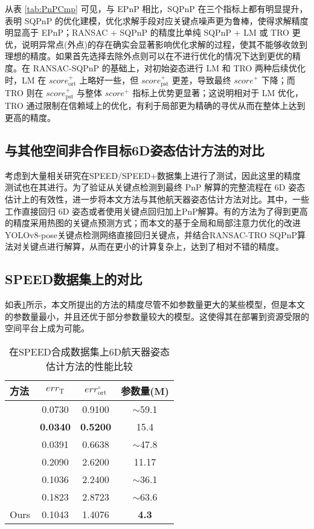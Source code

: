 从表 \ref{tab:PnPCmp} 可见，与 EPnP 相比，SQPnP 在三个指标上都有明显提升，表明 SQPnP 的优化建模，优化求解手段对应关键点噪声更为鲁棒，使得求解精度明显高于 EPnP；RANSAC + SQPnP 的精度比单纯 SQPnP + LM 或 TRO 更优，说明异常点(外点)的存在确实会显著影响优化求解的过程，使其不能够收敛到理想的精度。如果首先选择去除外点则可以在不进行优化的情况下达到更优的精度。在 RANSAC-SQPnP 的基础上，对初始姿态进行 LM 和 TRO 两种后续优化时，LM 在 $score_{\text{ort}}^+$ 上略好一些，但 $score_{\text{pst}}^+$ 更差，导致最终 $score^+$ 下降；而 TRO 则在 $score_{\text{pst}}^+$ 与整体 $score^+$ 指标上优势更显著；这说明相对于 LM 优化，TRO 通过限制在信赖域上的优化，有利于局部更为精确的寻优从而在整体上达到更高的精度。


\subsection{与其他空间非合作目标6D姿态估计方法的对比}
\label{sec:RANSAC-TRO-SQPnP:OthersCompare}
考虑到大量相关研究在SPEED/SPEED+数据集上进行了测试，因此这里的精度测试也在其进行。为了验证从关键点检测到最终 PnP 解算的完整流程在 6D 姿态估计上的有效性，进一步将本文方法与其他航天器姿态估计方法对比。其中，一些工作直接回归 6D 姿态或者使用关键点回归加上PnP解算。有的方法为了得到更高的精度采用热图的关键点预测方式；而本文的基于全局和局部注意力优化的改进YOLOv8-pose关键点检测网络直接回归关键点，并结合RANSAC-TRO SQPnP算法对关键点进行解算，从而在更小的计算复杂上，达到了相对不错的精度。


\subsection{SPEED数据集上的对比}
如表\ref{tab:SPEED_Comparison}所示，本文所提出的方法的精度尽管不如参数量更大的某些模型，但是本文的参数量最小，并且还优于部分参数量较大的模型。这使得其在部署到资源受限的空间平台上成为可能。
\begin{table}[htbp]
	\centering
	\caption{在SPEED合成数据集上6D航天器姿态估计方法的性能比较}
	\label{tab:SPEED_Comparison}
	\begin{tabular}{lccc}
		\toprule
		方法 & $err_{\text{T}}$ & $err_{\text{ort}}^{\circ}$ & 参数量(M) \\
		\midrule
		\citet{gerard2019segmentation} & 0.0730 & 0.9100 & $\sim$59.1 \\
		\citet{lotti2022investigating} & \textbf{0.0340} & \textbf{0.5200} & 15.4 \\
		\citet{wang2022revisiting} & 0.0391 & 0.6638 & $\sim$47.8 \\
		\citet{park2019towards} & 0.2090 & 2.6200 & 11.17 \\
		\citet{piazza2021deep} & 0.1036 & 2.2400 & $\sim$36.1 \\
		\citet{huan2020pose} & 0.1823 & 2.8723 & $\sim$63.6 \\
		Ours & 0.1043 & 1.4076 & \textbf{4.3} \\
		\bottomrule
	\end{tabular}
\end{table}


